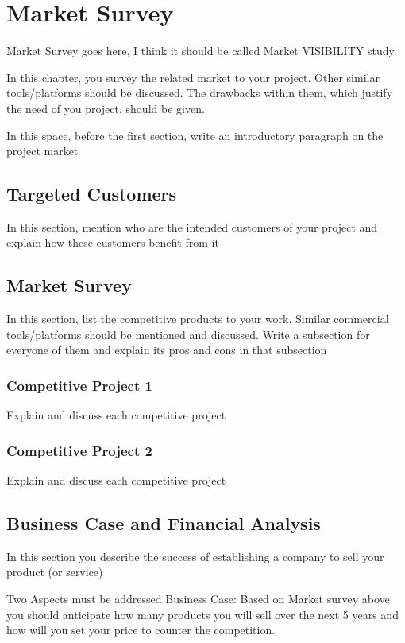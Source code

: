 \section{Market Survey}
Market Survey goes here, I think it should be called Market VISIBILITY study.

In this chapter, you survey the related market to your project. Other similar tools/platforms should be discussed. The drawbacks within them, which justify the need of you project, should be given.

In this space, before the first section, write an introductory paragraph on the project market

\subsection{Targeted Customers}
In this section, mention who are the intended customers of your project and explain how these customers benefit from it


\subsection{Market Survey}
In this section, list the competitive products to your work. Similar commercial tools/platforms should be mentioned and discussed. Write a subsection for everyone of them and explain its pros and cons in that subsection

\subsubsection{Competitive Project 1}
Explain and discuss each competitive project

\subsubsection{Competitive Project 2}
Explain and discuss each competitive project

\subsection{Business Case and Financial Analysis}

In this section you describe the success of establishing a company to sell your product (or service) 

Two Aspects must be addressed
Business Case:   Based on Market survey above you should anticipate how many products you will sell over the next 5 years and how will you set your price to counter the competition.

